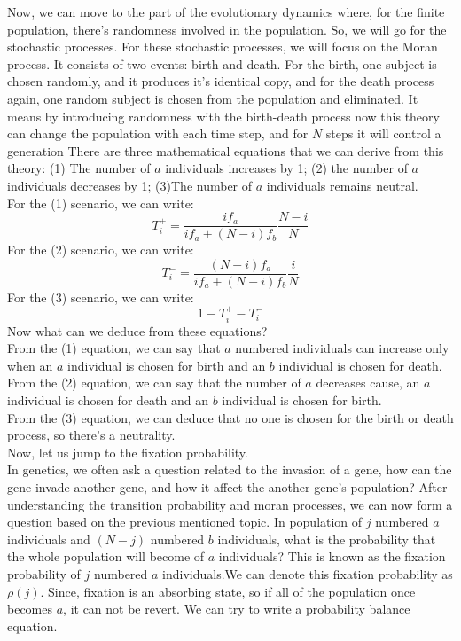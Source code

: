 \documentclass{article}
\begin{document}
Now, we can move to the part of the evolutionary dynamics where, for the finite population, there's randomness involved in the population. So, we will go for the stochastic processes.
For these stochastic processes, we will focus on the Moran process. It consists of two events: birth and death. For the birth, one subject is chosen randomly, and it produces it's identical copy, and for the death process again, one random subject is chosen from the population and eliminated. It means by introducing randomness with the birth-death process now this theory can change the population with each time step, and for $N$ steps it will control a generation \cite{Moran1962}
There are three mathematical equations that we can derive from this theory: (1) The number of $a$ individuals increases by 1; (2) the number of $a$ individuals decreases by 1; (3)The number of $a$ individuals remains neutral.\\
For the (1) scenario, we can write:
\[T_i^+=\frac{if_a}{if_a+(N-i)f_b}\frac{N-i}{N}\]
For the (2) scenario, we can write:
\[T_i^-=\frac{(N-i)f_a}{if_a+(N-i)f_b}\frac{i}{N}\]
For the (3) scenario, we can write:
\[1-T_i^+-T_i^-\]
Now what can we deduce from these equations?\\
From the (1) equation, we can say that $a$ numbered individuals can increase only when an $a$ individual is chosen for birth and an $b$ individual is chosen for death.\\
From the (2) equation, we can say that the number of $a$ decreases cause, an $a$ individual is chosen for death and an $b$ individual is chosen for birth.\\
From the (3) equation, we can deduce that no one is chosen for the birth or death process, so there's a neutrality.\\
Now, let us jump to the fixation probability.\\
In genetics, we often ask a question related to the invasion of a gene, how can the gene invade another gene, and how it affect the another gene's population?
After understanding the transition probability and moran processes, we can now form a question based on the previous mentioned topic. In population of $j$ numbered $a$ individuals and $(N-j)$ numbered $b$ individuals, what is the probability that the whole population will become of $a$ individuals?
This is known as the fixation probability of $j$ numbered $a$ individuals.We can denote this fixation probability as $\rho(j)$.
Since, fixation is an absorbing state, so if all of the population once becomes $a$, it can not be revert. We can try to write a probability balance equation.
\end{document}
